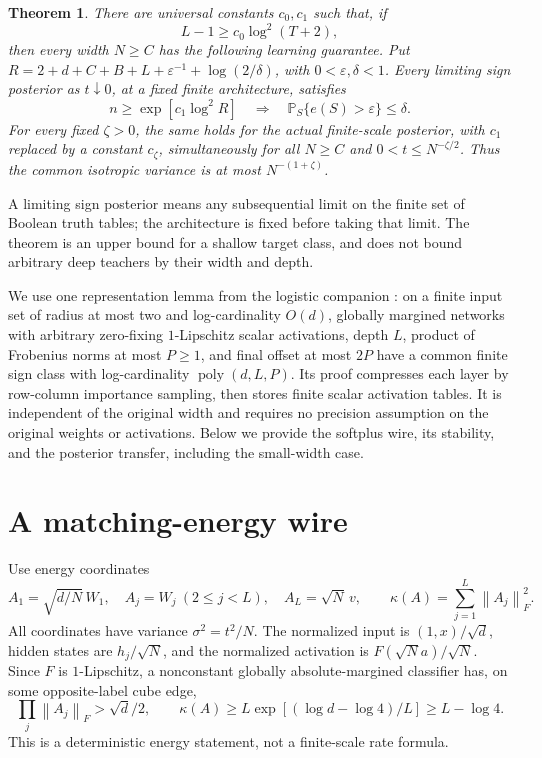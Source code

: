\documentclass[11pt]{article}
\newtheorem{theorem}{Theorem}[section]
\theoremstyle{remark}\newtheorem{remark}[theorem]{Remark}
\newcommand{\Prb}{\mathbb P}
\newcommand{\norm}[1]{\left\lVert #1\right\rVert}
\newcommand{\poly}{\operatorname{poly}}
\begin{document}
\begin{theorem}\label{thm:main}
There are universal constants $c_0,c_1$ such that, if
\[
 L-1\ge c_0\log^2(T+2),
\]
then every width $N\ge C$ has the following learning guarantee. Put
$R=2+d+C+B+L+\varepsilon^{-1}+\log(2/\delta)$, with
$0<\varepsilon,\delta<1$.
Every limiting sign posterior as $t\downarrow0$, at a fixed finite
architecture, satisfies
\[
 n\ge\exp[c_1\log^2R]
 \quad\Longrightarrow\quad
 \Prb_S\{e(S)>\varepsilon\}\le\delta.
\]
For every fixed $\zeta>0$, the same holds for the actual finite-scale
posterior, with $c_1$ replaced by a constant $c_\zeta$, simultaneously for
all $N\ge C$ and $0<t\le N^{-\zeta/2}$. Thus the common isotropic
variance is at most $N^{-(1+\zeta)}$.
\end{theorem}

A limiting sign posterior means any subsequential limit on the finite
set of Boolean truth tables; the architecture is fixed before taking
that limit. The theorem is an upper bound for a shallow target class,
and does not bound arbitrary deep teachers by their width and depth.

We use one representation lemma from the logistic companion
\cite{logistic}: on a finite input set of radius at most two and
log-cardinality $O(d)$, globally margined networks with arbitrary
zero-fixing $1$-Lipschitz scalar activations, depth $L$, product of
Frobenius norms at most $P\ge1$, and final offset at most $2P$ have a
common finite sign class with log-cardinality $\poly(d,L,P)$.
Its proof compresses each layer by row-column importance sampling,
then stores finite scalar activation tables. It is independent of the
original width and requires no precision assumption on the original
weights or activations. Below we provide the softplus wire, its
stability, and the posterior transfer, including the small-width case.

\section{A matching-energy wire}

Use energy coordinates
\[
 A_1=\sqrt{d/N}\,W_1,\quad A_j=W_j\ (2\le j<L),\quad
 A_L=\sqrt N\,v,\qquad \kappa(A)=\sum_{j=1}^L\norm{A_j}_F^2.
\]
All coordinates have variance $\sigma^2=t^2/N$. The normalized input
is $(1,x)/\sqrt d$, hidden states are $h_j/\sqrt N$, and the normalized
activation is $F(\sqrt N a)/\sqrt N$. Since $F$ is $1$-Lipschitz, a
nonconstant globally absolute-margined classifier has, on some
opposite-label cube edge,
\begin{equation}\label{eq:lower}
 \prod_j\norm{A_j}_F>\sqrt d/2,\qquad
 \kappa(A)\ge L\exp[(\log d-\log4)/L]\ge L-\log4.
\end{equation}
This is a deterministic energy statement, not a finite-scale rate formula.
\end{document}
